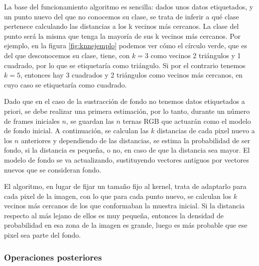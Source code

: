 La base del funcionamiento algoritmo es sencilla: dados unos datos etiquetados, y un punto nuevo del que no conocemos su clase, se trata de inferir a qué clase pertenece calculando las distancias a los k vecinos más cercanos. La clase del punto será la misma que tenga la mayoría de sus k vecinos más cercanos. Por ejemplo, en la figura \ref{fig:knnejemplo} podemos ver cómo el círculo verde, que es del que desconocemos su clase, tiene, con $k=3$ como vecinos 2 triángulos y 1 cuadrado, por lo que se etiquetaría como triángulo. Si por el contrario tenemos $k=5$, entonces hay 3 cuadrados y 2 triángulos como vecinos más cercanos, en cuyo caso se etiquetaría como cuadrado.

Dado que en el caso de la sustracción de fondo no tenemos datos etiquetados a priori, se debe realizar una primera estimación, por lo tanto, durante un número de frames iniciales $n$, se guardan las $n$ ternas RGB que actuarán como el modelo de fondo inicial. A continuación, se calculan las $k$ distancias de cada pixel nuevo a los $n$ anteriores y dependiendo de las distancias, se estima la probabilidad de ser fondo, si la distancia es pequeña, o no, en caso de que la distancia sea mayor. El modelo de fondo se va actualizando, sustituyendo vectores antiguos por vectores nuevos que se consideran fondo.

El algoritmo, en lugar de fijar un tamaño fijo al kernel, trata de adaptarlo para cada pixel de la imagen, con lo que para cada punto nuevo, se calculan los $k$ vecinos más cercanos de los que conformaban la muestra inicial. Si la distancia respecto al más lejano de ellos es muy pequeña, entonces la densidad de probabilidad en esa zona de la imagen es grande, luego es más probable que ese pixel sea parte del fondo\cite{art:Zivkovic2}.

\subsubsection*{Operaciones posteriores}

